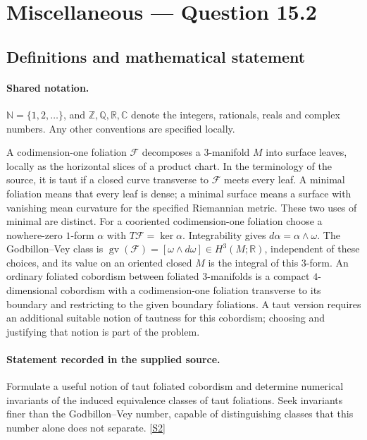 \documentclass[11pt]{article}
\newcommand{\sref}[2]{\hyperlink{source:#1:#2}{[S#2]}}
\begin{document}
\section{Miscellaneous — Question 15.2}\label{statement}

\subsection{Definitions and mathematical statement}

\paragraph{Shared notation.}$\mathbb N=\{1,2,\ldots\}$, and $\mathbb Z,\mathbb Q,\mathbb R,\mathbb C$ denote the integers, rationals, reals and complex numbers. Any other conventions are specified locally.


A codimension-one foliation $\mathcal F$ decomposes a $3$-manifold $M$ into surface leaves, locally as the horizontal slices of a product chart. In the terminology of the source, it is taut if a closed curve transverse to $\mathcal F$ meets every leaf. A minimal foliation means that every leaf is dense; a minimal surface means a surface with vanishing mean curvature for the specified Riemannian metric. These two uses of minimal are distinct. For a cooriented codimension-one foliation choose a nowhere-zero $1$-form $\alpha$ with $T\mathcal F=\ker\alpha$. Integrability gives $d\alpha=\alpha\wedge\omega$. The Godbillon--Vey class is $\operatorname{gv}(\mathcal F)=[\omega\wedge d\omega]\in H^3(M;\mathbb R)$, independent of these choices, and its value on an oriented closed $M$ is the integral of this $3$-form. An ordinary foliated cobordism between foliated $3$-manifolds is a compact $4$-dimensional cobordism with a codimension-one foliation transverse to its boundary and restricting to the given boundary foliations. A taut version requires an additional suitable notion of tautness for this cobordism; choosing and justifying that notion is part of the problem.
\paragraph{Statement recorded in the supplied source.}
Formulate a useful notion of taut foliated cobordism and determine numerical invariants of the induced equivalence classes of taut foliations. Seek invariants finer than the Godbillon--Vey number, capable of distinguishing classes that this number alone does not separate. \sref{statement}{2}
\end{document}
